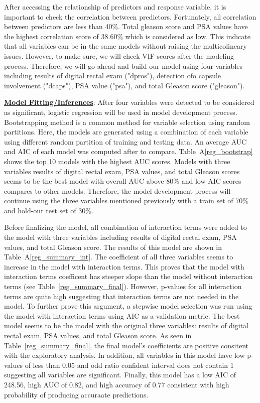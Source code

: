 \documentclass[11pt]{article}\usepackage[]{graphicx}\usepackage[]{color}
\begin{document}
\noindent After accessing the relationship of predictors and response variable, it is important to check the correlation between predictors. Fortunately, all correlation between predictors are less than 40\%. Total gleason score and PSA values have the highest correlation score of 38.60\% which is considered as low. This indicate that all variables can be in the same models without raising the multicolineary issues. However, to make sure, we will check VIF scores after the modeling process. Therefore, we will go ahead and build our model using four variables including results of digital rectal exam ("dpros"), detection ofo capsule involvement ("dcaps"), PSA value ("psa"), and total Gleason score ("gleason").
\hfill \break

\noindent\textbf{\underline{Model Fitting/Inferences}}: After four variables were detected to be considered as significant, logistic regression will be used in model development process. Bootstrapping method is a common method for variable selection using random partitions. Here, the models are generated using a combination of each variable using different random partition of training and testing data. An average AUC and AIC of each model was computed after to compare. Table~A\ref{reg_bootstrap} shows the top 10 models with the highest AUC scores. Models with three variables results of digital rectal exam, PSA values, and total Gleason scores seems to be the best model with overall AUC above 80\% and low AIC scores compares to other models. Therefore, the model development process will continue using the three variables mentioned previously with a train set of 70\% and hold-out test set of 30\%.
\hfill \break

\noindent Before finalizing the model, all combination of interaction terms were added to the model with three variables including results of digital rectal exam, PSA values, and total Gleason score. The results of this model are shown in Table~A\ref{reg_summary_int}. The coefficient of all three variables seems to increase in the model with interaction terms. This proves that the model with interaction terms coefficent has steeper slope than the model without interaction terms (see Table~\ref{reg_summary_final}). However, p-values for all interaction terms are quite high suggesting that interaction terms are not needed in the model. To further prove this argument, a stepwise model selection was run using the model with interaction terms using AIC as a validation metric. The best model seems to be the model with the original three variables: results of digital rectal exam, PSA values, and total Gleason score. As seen in Table~\ref{reg_summary_final}, the final model's coefficients are positive consitent with the exploratory analysis. In addition, all variables in this model have low p-values of less than 0.05 and odd ratio confident interval does not contain 1 suggesting all variables are significant. Finally, this model has a low AIC of 248.56, high AUC of 0.82, and high accuracy of 0.77 consistent with high probability of producing accuraate predictions.
\noindent 
\end{document}
